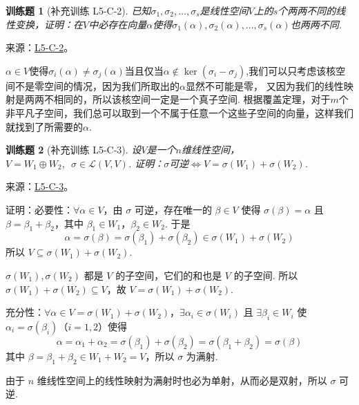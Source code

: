\documentclass[UTF8,12pt,a4paper,fontset=fandol]{ctexart}
\newtheorem{exercise}{训练题}[section]
\begin{document}
\begin{exercise}[补充训练 L5-C-2]\label{prob:L5-C-2}
已知$\sigma_1,\sigma_2,\ldots,\sigma_s$是线性空间$V$上的$s$个两两不同的线性变换，证明：在$V$中必存在向量$\alpha$使得$\sigma_1(\alpha),\sigma_2(\alpha),\ldots,\sigma_s(\alpha)$也两两不同.
\end{exercise}
\noindent 来源：\href{https://github.com/yhwu-is/Linear-Algebra-Left-Undone/blob/new/%E8%AE%B2%E4%B9%89/%E4%B8%93%E9%A2%98/5%20%E7%BA%BF%E6%80%A7%E6%98%A0%E5%B0%84.tex}{L5-C-2}。
\begin{solve}
$\alpha \in V$使得$\sigma_i(\alpha) \neq \sigma_j(\alpha)$当且仅当$\alpha \notin \ker(\sigma_i - \sigma_j)$,我们可以只考虑该核空间不是零空间的情况，因为我们所取出的$\alpha$显然不可能是零，
            又因为我们的线性映射是两两不相同的，所以该核空间一定是一个真子空间. 根据覆盖定理，对于$m$个非平凡子空间，我们总可以取到一个不属于任意一个这些子空间的向量，这样我们就找到了所需要的$\alpha$.
\end{solve}

\begin{exercise}[补充训练 L5-C-3]\label{prob:L5-C-3}
设$V$是一个$n$维线性空间，$V=W_1\oplus W_2,\enspace\sigma\in \mathcal{L}(V,V)$. 证明：$\sigma$可逆$\iff V=\sigma(W_1)+\sigma(W_2)$.
\end{exercise}
\noindent 来源：\href{https://github.com/yhwu-is/Linear-Algebra-Left-Undone/blob/new/%E8%AE%B2%E4%B9%89/%E4%B8%93%E9%A2%98/5%20%E7%BA%BF%E6%80%A7%E6%98%A0%E5%B0%84.tex}{L5-C-3}。
\begin{solve}
证明：必要性：$ \forall \alpha \in V $，由 $ \sigma $ 可逆，存在唯一的 $ \beta \in V $ 使得 $ \sigma(\beta) = \alpha $ 且 $ \beta = \beta_1 + \beta_2 $，其中 $ \beta_1 \in W_1 $，$ \beta_2 \in W_2 $. 于是
          \[ \alpha = \sigma(\beta) = \sigma(\beta_1) + \sigma(\beta_2) \in \sigma(W_1) + \sigma(W_2) \]
          所以 $ V \subseteq \sigma(W_1) + \sigma(W_2) $.

          $ \sigma(W_1), \sigma(W_2) $ 都是 $ V $ 的子空间，它们的和也是 $ V $ 的子空间. 所以 $ \sigma(W_1) + \sigma(W_2) \subseteq V $，故 $ V = \sigma(W_1) + \sigma(W_2) $.

          充分性：$ \forall \alpha \in V = \sigma(W_1) + \sigma(W_2) $，$ \exists \alpha_i \in \sigma(W_i) $ 且 $ \exists \beta_i \in W_i $ 使 $ \alpha_i = \sigma(\beta_i) $（$ i = 1, 2 $）使得
          \[ \alpha = \alpha_1 + \alpha_2 = \sigma(\beta_1) + \sigma(\beta_2) = \sigma(\beta_1 + \beta_2) = \sigma(\beta) \]
          其中 $ \beta = \beta_1 + \beta_2 \in W_1 + W_2 = V $，所以 $ \sigma $ 为满射.

          由于 $ n $ 维线性空间上的线性映射为满射时也必为单射，从而必是双射，所以 $ \sigma $ 可逆.
\end{solve}
\end{document}

